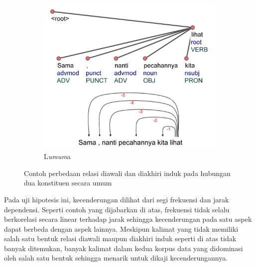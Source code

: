 \documentclass[10pt, a4paper, conference, compsocconf]{IEEEtran}
\begin{document}
\begin{figure}
\begin{subfigure}{.46\linewidth}
  \includegraphics[width=1\linewidth]{pics/ls7375.jpg} 
	\caption{L\textit{umum}a}
	\label{fig:ls7375} 
\end{subfigure}

\caption{Contoh perbedaan relasi diawali dan diakhiri induk pada hubungan dua konstituen secara umum}
\label{fig:umumcontoh}
\end{figure}

Pada uji hipotesis ini, kecenderungan dilihat dari segi frekuensi dan jarak dependensi. Seperti contoh yang dijabarkan di atas, frekuensi tidak selalu berkorelasi secara linear terhadap jarak sehingga kecenderungan pada satu aspek dapat berbeda dengan aspek lainnya. Meskipun kalimat yang tidak memiliki salah satu bentuk relasi diawali maupun diakhiri induk seperti di atas tidak banyak ditemukan, banyak kalimat dalam kedua korpus data yang didominasi oleh salah satu bentuk sehingga menarik untuk dikaji kecenderungannya.
\end{document}
